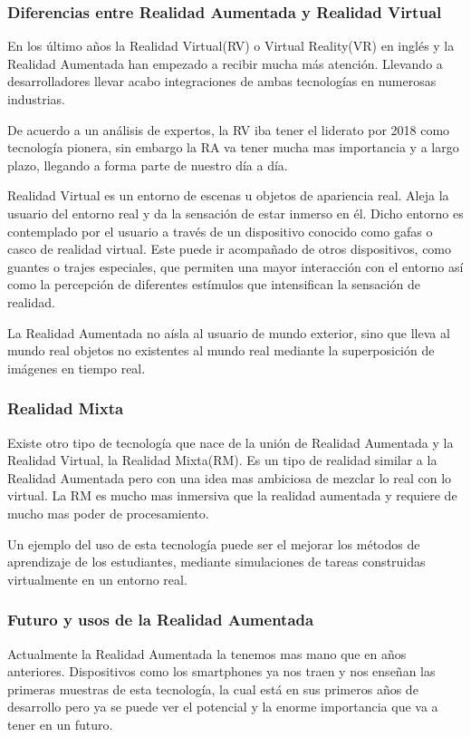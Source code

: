 \subsubsection{Diferencias entre Realidad Aumentada y Realidad Virtual}
En los último años la Realidad Virtual(RV)\cite{URL::VR} o Virtual Reality(VR) en inglés y la Realidad Aumentada han empezado a recibir mucha más atención. Llevando a desarrolladores llevar acabo integraciones de ambas tecnologías en numerosas industrias.

De acuerdo a un análisis de expertos, la RV iba tener el liderato por 2018 como tecnología pionera, sin embargo la RA va tener mucha mas importancia y a largo plazo, llegando a forma parte de nuestro día a día.

Realidad Virtual es un entorno de escenas u objetos de apariencia real. Aleja la usuario del entorno real y da la sensación de estar inmerso en él. Dicho entorno es contemplado por el usuario a través de un dispositivo conocido como gafas o casco de realidad virtual. Este puede ir acompañado de otros dispositivos, como guantes o trajes especiales, que permiten una mayor interacción con el entorno así como la percepción de diferentes estímulos que intensifican la sensación de realidad.

La Realidad Aumentada no aísla al usuario de mundo exterior, sino que lleva al mundo real objetos no existentes al mundo real mediante la superposición de imágenes en tiempo real.	

\subsubsection{Realidad Mixta}

Existe otro tipo de tecnología que nace de la unión de Realidad Aumentada y la Realidad Virtual, la Realidad Mixta(RM)\cite{URL::RM}. Es un tipo de realidad similar a la Realidad Aumentada pero con una idea mas ambiciosa de mezclar lo real con lo virtual. La RM es mucho mas inmersiva que la realidad aumentada y requiere de mucho mas poder de procesamiento.

Un ejemplo del uso de esta tecnología puede ser el mejorar los métodos de aprendizaje de los estudiantes, mediante simulaciones de tareas construidas virtualmente en un entorno real.  


\subsubsection{Futuro y usos de la Realidad Aumentada}
Actualmente la Realidad Aumentada la tenemos mas mano que en años anteriores. Dispositivos como los smartphones ya nos traen y nos enseñan las primeras muestras de esta tecnología, la cual está en sus primeros años de desarrollo pero ya se puede ver el potencial y la enorme importancia que va a tener en un futuro.

